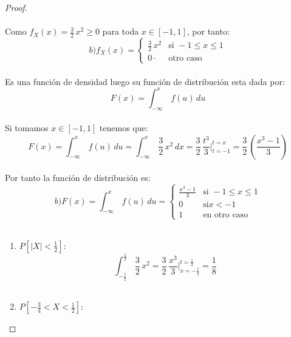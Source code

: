 \documentclass[11pt,letterpaper]{article}
\begin{document}
\begin{proof}
\begin{equation*}
\end{equation*}\,\\
Como $f_X(x)=\frac{3}{2}\,x^2\geq 0$ para toda $x\in [-1,1]$, por tanto:\,\\
\begin{equation*}
   b)f_X(x)=\begin{cases} 
      \frac{3}{2}\,x^2             & \mbox{si } -1\leq x\leq 1  \\
      0 \cdot                         & \text{otro caso}
   \end{cases}
\end{equation*}\,\\
Es una funci\'on de densidad luego su funci\'on de distribuci\'on esta dada por:\,\\
\begin{equation*}
  F(x)=\int_{-\infty}^{x}\,f(u)\,du
\end{equation*}\,\\
Si tomamos $x\in[-1,1]$ tenemos que:\,\\
\begin{equation*}
  F(x)=\int_{-\infty}^{x}\,f(u)\,du=\int_{-\infty}^{x}\,\frac{3}{2}\,x^2\,dx=\frac{3}{2}\,\frac{t^3}{3}\big|_{t = -1}^{t = x}=\frac{3}{2}\,\left(\frac{x^3-1}{3}\right)
\end{equation*}\,\\
Por tanto la funci\'on de distribuci\'on es:\,\\
\begin{equation*}
   b)F(x)=\int_{-\infty}^{x}\,f(u)\,du=\begin{cases} 
      \frac{x^3-1}{3}        & \mbox{si } -1\leq x\leq 1  \\
      0                         & \mbox{si} x<-1 \\
      1                         &\text{en otro caso}
   \end{cases}
\end{equation*}\,\\
\begin{enumerate}
  \item $P[|X|<\frac{1}{2}]$:\,\\
  \begin{equation*}
      \int_{-\frac{1}{2}}^{\frac{1}{2}}\,\frac{3}{2}\,x^2=\frac{3}{2}\,\frac{x^3}{3}\big|_{x = -\frac{1}{2}}^{t = \frac{1}{2}}=\frac{1}{8}
  \end{equation*}\,\\
  \item $P[-\frac{3}{4}<X<\frac{1}{2}]$:\,\\

\end{enumerate}
\end{proof}
\end{document}

